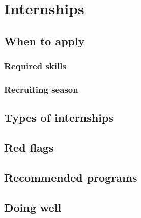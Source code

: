 \chapter{Internships}
\section{When to apply}
\subsection{Required skills}
\subsection{Recruiting season}
\section{Types of internships}
\section{Red flags}
\section{Recommended programs}
\section{Doing well}